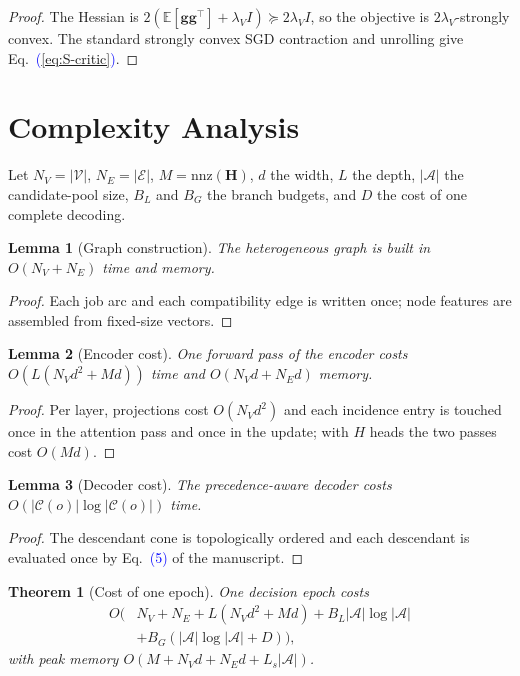 \documentclass[conference]{IEEEtran}
\newtheorem{lemma}{Lemma}
\newtheorem{theorem}{Theorem}
\theoremstyle{remark}
\newcommand{\Eqref}[1]{\textcolor{blue}{(\ref{#1})}}
\newcommand{\cA}{\mathcal{A}}
\newcommand{\cE}{\mathcal{E}}
\newcommand{\cV}{\mathcal{V}}
\newcommand{\cC}{\mathcal{C}}
\begin{document}
\begin{proof}
The Hessian is $2(\mathbb{E}[\bm{g}\bm{g}^{\top}]+\lambda_VI)\succeq2\lambda_VI$, so the objective is $2\lambda_V$-strongly convex. The standard strongly convex SGD contraction and unrolling give Eq.~\Eqref{eq:S-critic}.
\end{proof}

\section{Complexity Analysis}
\label{sec:S-compl}

Let $N_V=|\cV|$, $N_E=|\cE|$, $M=\mathrm{nnz}(\bm{H})$, $d$ the width, $L$ the depth, $|\cA|$ the candidate-pool size, $B_L$ and $B_G$ the branch budgets, and $D$ the cost of one complete decoding.

\begin{lemma}[Graph construction]
\label{lem:S-graph}
The heterogeneous graph is built in $O(N_V+N_E)$ time and memory.
\end{lemma}

\begin{proof}
Each job arc and each compatibility edge is written once; node features are assembled from fixed-size vectors.
\end{proof}

\begin{lemma}[Encoder cost]
\label{lem:S-encoder}
One forward pass of the encoder costs $O(L(N_Vd^2+Md))$ time and $O(N_Vd+N_Ed)$ memory.
\end{lemma}

\begin{proof}
Per layer, projections cost $O(N_Vd^2)$ and each incidence entry is touched once in the attention pass and once in the update; with $H$ heads the two passes cost $O(Md)$.
\end{proof}

\begin{lemma}[Decoder cost]
\label{lem:S-decoder}
The precedence-aware decoder costs $O(|\cC(o)|\log|\cC(o)|)$ time.
\end{lemma}

\begin{proof}
The descendant cone is topologically ordered and each descendant is evaluated once by Eq.~\textcolor{blue}{(5)} of the manuscript.
\end{proof}

\begin{theorem}[Cost of one epoch]
\label{thm:S-epoch}
One decision epoch costs
\begin{equation}
\begin{aligned}
O\Big(&N_V+N_E+L(N_Vd^2+Md)+B_L|\cA|\log|\cA|\\
&+B_G(|\cA|\log|\cA|+D)\Big),
\end{aligned}
\label{eq:S-epoch}
\end{equation}
with peak memory $O(M+N_Vd+N_Ed+L_s|\cA|)$.
\end{theorem}
\end{document}
